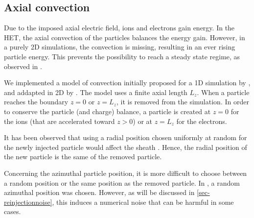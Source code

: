 \subsection{Axial convection}

Due to the imposed axial electric field, ions and electrons gain energy.
In the \ac{HET}, the axial convection of the particles balances the energy gain.
However, in a purely \ac{2D} simulations, the convection is missing, resulting in an ever rising particle energy.
This prevents the possibility to reach a steady state regime, as observed in \citet{heron2013,janhunen2018}.

We implemented a model of convection initially proposed for a \ac{1D} simulation by \citet{lafleur2016a}, and addapted in \ac{2D} by \citet{croes2017a}.
The model uses a finite axial length $L_z$.
When a particle reaches the boundary $z=0$ or $z=L_z$, it is removed from the simulation.
In order to conserve the particle (and charge) balance, a particle is created at $z=0$ for the ions (that are accelerated toward $z>0$) or at $z=L_z$ for the electrons.

It has been observed that using a radial position chosen uniformly at random for the newly injected particle would affect the sheath \citep{croes2017a}.
Hence, the radial position of the new particle is the same of the removed particle.

Concerning the azimuthal particle position, it is more difficult to choose between a random position or the same position as the removed particle.
In \citet{lafleur2016a,croes2017a}, a random azimuthal position was chosen.
However, as will be discussed in \cref{sec-reinjectionnoise}, this induces a numerical noise that can be harmful in some cases.
